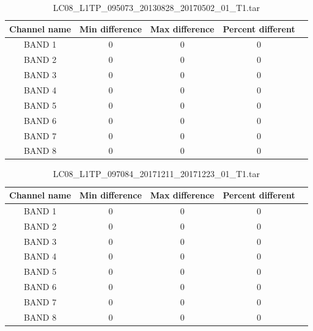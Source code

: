 \documentclass[a4paper]{article}
\begin{document}
    \begin{table}[ht!]
      \caption{LC08\_L1TP\_095073\_20130828\_20170502\_01\_T1.tar}\label{table:12}
      \centering
      \small
      \begin{tabular}{ccccc} \midrule
        \textbf{Channel name} & \textbf{Min difference} & \textbf{Max difference} & \textbf{Percent different} \\ \midrule
        BAND 1 & 0 & 0 & 0 \\
        BAND 2 & 0 & 0 & 0 \\
        BAND 3 & 0 & 0 & 0 \\
        BAND 4 & 0 & 0 & 0 \\
        BAND 5 & 0 & 0 & 0 \\
        BAND 6 & 0 & 0 & 0 \\
        BAND 7 & 0 & 0 & 0 \\
        BAND 8 & 0 & 0 & 0 \\ \midrule
      \end{tabular}
    \end{table}

    \begin{table}[ht!]
      \caption{LC08\_L1TP\_097084\_20171211\_20171223\_01\_T1.tar}\label{table:13}
      \centering
      \small
      \begin{tabular}{ccccc} \midrule
        \textbf{Channel name} & \textbf{Min difference} & \textbf{Max difference} & \textbf{Percent different} \\ \midrule
        BAND 1 & 0 & 0 & 0 \\
        BAND 2 & 0 & 0 & 0 \\
        BAND 3 & 0 & 0 & 0 \\
        BAND 4 & 0 & 0 & 0 \\
        BAND 5 & 0 & 0 & 0 \\
        BAND 6 & 0 & 0 & 0 \\
        BAND 7 & 0 & 0 & 0 \\
        BAND 8 & 0 & 0 & 0 \\ \midrule
      \end{tabular}
    \end{table}

  \clearpage
\end{document}
